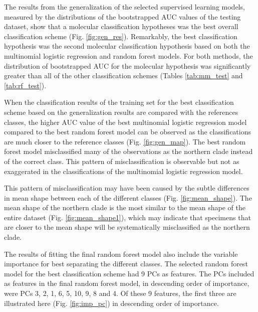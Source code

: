 \documentclass[12pt,letterpaper]{article}\usepackage{graphicx, color}
\begin{document}
The results from the generalization of the selected supervised learning models, measured by the distributions of the bootstrapped AUC values of the testing dataset, show that a molecular classification hypotheses was the best overall classification scheme (Fig. \ref{fig:gen_res}). Remarkably, the best classification hypothesis was the second molecular classification hypothesis based on both the multinomial logistic regression and random forest models. For both methods, the distribution of bootstrapped AUC for the molecular hypothesis was significantly greater than all of the other classification schemes (Tables \ref{tab:mm_test} and \ref{tab:rf_test}). 


When the classification results of the training set for the best classification scheme based on the generalization results are compared with the references classes, the higher AUC value of the best multinomial logistic regression model compared to the best random forest model can be observed as the classifications are much closer to the reference classes (Fig. \ref{fig:gen_map}). The best random forest model misclassified many of the observations as the northern clade instead of the correct class. This pattern of misclassification is observable but not as exaggerated in the classifications of the multinomial logistic regression model.

This pattern of misclassification may have been caused by the subtle differences in mean shape between each of the different classes (Fig. \ref{fig:mean_shape}). The mean shape of the northern clade is the most similar to the mean shape of the entire dataset (Fig. \ref{fig:mean_shape1}), which may indicate that specimens that are closer to the mean shape will be systematically misclassified as the northern clade.



The results of fitting the final random forest model also include the variable importance for best separating the different classes. The selected random forest model for the best classification scheme had 9 PCs as features. The PCs included as features in the final random forest model, in descending order of importance, were PCs 3, 2, 1, 6, 5, 10, 9, 8 and 4. Of these 9 features, the first three are illustrated here (Fig. \ref{fig:imp_pc}) in descending order of importance. 
\end{document}
